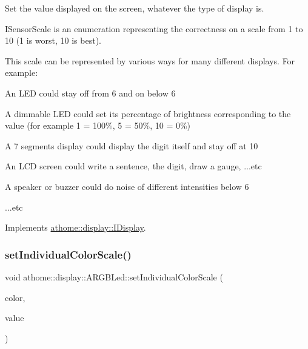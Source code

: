 Set the value displayed on the screen, whatever the type of display is.

I\+Sensor\+Scale is an enumeration representing the correctness on a scale from 1 to 10 (1 is worst, 10 is best).

This scale can be represented by various ways for many different displays. For example\+:


\begin{DoxyItemize}
\item An L\+ED could stay off from 6 and on below 6
\item A dimmable L\+ED could set it\textquotesingle{}s percentage of brightness corresponding to the value (for example 1 = 100\%, 5 = 50\%, 10 = 0\%)
\item A 7 segments display could display the digit itself and stay off at 10
\item An L\+CD screen could write a sentence, the digit, draw a gauge, ...etc
\item A speaker or buzzer could do noise of different intensities below 6
\item ...etc 
\end{DoxyItemize}

Implements \mbox{\hyperlink{classathome_1_1display_1_1_i_display_a3c9678f929e4bc04742d458b0c2399ef}{athome\+::display\+::\+I\+Display}}.

\mbox{\label{classathome_1_1display_1_1_a_r_g_b_led_a69e31887e1a37a86073d5f82bd578f1f}} 
\subsubsection{\texorpdfstring{set\+Individual\+Color\+Scale()}{setIndividualColorScale()}}
{\footnotesize\ttfamily void athome\+::display\+::\+A\+R\+G\+B\+Led\+::set\+Individual\+Color\+Scale (\begin{DoxyParamCaption}\item[{const \mbox{\hyperlink{structathome_1_1display_1_1_a_r_g_b_led_1_1_color}{Color}} \&}]{color,  }\item[{\mbox{\hyperlink{classathome_1_1sensor_1_1_i_sensor_aa70bc27a4c17c86caf96cca776541ddf}{sensor\+::\+I\+Sensor\+::\+I\+Sensor\+Scale}}}]{value }\end{DoxyParamCaption})\hspace{0.3cm}{\ttfamily [inline]}}

